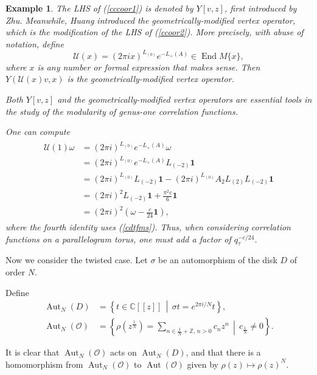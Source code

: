 \documentclass[9pt]{amsart}
\newtheorem{example}{Example}[section]
\begin{document}
\begin{example}
The LHS of (\ref{cccoor1}) is denoted by $Y[v,z]$, first introduced by Zhu. Meanwhile, Huang introduced the geometrically-modified vertex operator, which is the modification of the LHS of (\ref{ccoor2}). More precisely, with abuse of notation, define
\[
\mathcal{U}(x) = (2\pi i x)^{L_{(0)}} e^{-L_{+}(A)} \in \operatorname{End}M\{x\},
\]
where $x$ is any number or formal expression that makes sense. Then $Y(\mathcal{U}(x)v, x)$ is the geometrically-modified vertex operator.

Both $Y[v,z]$ and the geometrically-modified vertex operators are essential tools in the study of the modularity of genus-one correlation functions.

One can compute \cite[Lemma 1.1]{huang2005differential}
\begin{align}\label{virasoro}
\begin{split}
\mathcal{U}(1)\omega 
&= (2\pi i)^{L_{(0)}} e^{-L_{+}(A)} \omega \\
&= (2\pi i)^{L_{(0)}} e^{-L_{+}(A)} L_{(-2)} \mathbf{1} \\
&= (2\pi i)^{L_{(0)}} L_{(-2)} \mathbf{1} - (2\pi i)^{L_{(0)}} A_2 L_{(2)} L_{(-2)} \mathbf{1} \\
&= (2\pi i)^2 L_{(-2)} \mathbf{1} + \frac{\pi^2 c}{6} \mathbf{1} \\
&= (2\pi i)^2 \left(\omega - \frac{c}{24} \mathbf{1}\right),
\end{split}
\end{align}
where the fourth identity uses (\ref{cdtfms}). Thus, when considering correlation functions on a parallelogram torus, one must add a factor of $q_{\tau}^{-c/24}$.
\end{example}
Now we consider the twisted case. Let $\sigma$ be an automorphism of the disk $D$ of order $N$.

Define
\begin{align*}
    \operatorname{Aut}_{N}(D) &= \left\{ t \in \mathbb{C}[[z]] \,\middle|\, \sigma t = e^{2\pi i/N}t \right\}, \\
    \operatorname{Aut}_{N}(\mathcal{O}) &= \left\{ \rho(z^{\frac{1}{N}}) = \sum_{n \in \frac{1}{N} + \mathbb{Z},\, n > 0} c_n z^n \,\middle|\, c_{\frac{1}{N}} \neq 0 \right\}.
\end{align*}

It is clear that $\operatorname{Aut}_{N}(\mathcal{O})$ acts on $\operatorname{Aut}_{N}(D)$, and that there is a homomorphism from $\operatorname{Aut}_{N}(\mathcal{O})$ to $\operatorname{Aut}(\mathcal{O})$ given by $\rho(z) \mapsto \rho(z)^N$.
\end{document}
